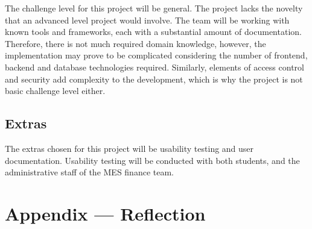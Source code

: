 \documentclass{article}
\begin{document}
The challenge level for this project will be general. The project lacks the novelty that an advanced level project would involve. The team will be working with known tools and frameworks, each with a substantial amount of documentation. Therefore, there is not much required domain knowledge, however, the implementation may prove to be complicated considering the number of frontend, backend and database technologies required. Similarly, elements of access control and security add complexity to the development, which is why the project is not basic challenge level either.

\subsection{Extras}

The extras chosen for this project will be usability testing and user documentation. Usability testing will be conducted with both students, and the administrative staff of the MES finance team.

\newpage{}

\section*{Appendix --- Reflection}



\end{document}
